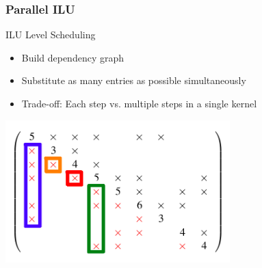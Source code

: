 \begin{frame}[fragile]
\frametitle{Parallel ILU}

     \begin{block}{ILU Level Scheduling}
      \begin{itemize}
        \item Build dependency graph
        \item Substitute as many entries as possible simultaneously
        \item Trade-off: Each step vs. multiple steps in a single kernel
      \end{itemize}

      \begin{center}
    \includegraphics[width=0.65\textwidth]{figures/level-scheduling-3.png}
      \end{center}

    \end{block}
\end{frame}


